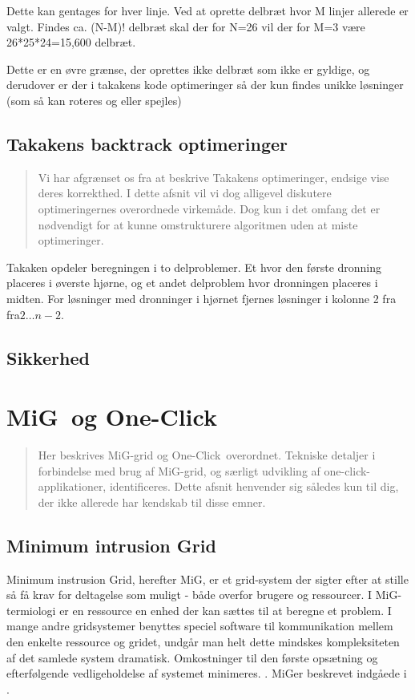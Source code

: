 \documentclass[final,a4paper,10pt]{article}
\newcommand{\mig}{MiG}
\newcommand{\oc}{One-Click}
\begin{document}
Dette kan gentages for hver linje. Ved at oprette delbræt hvor M linjer allerede er valgt. Findes ca. (N-M)! delbræt skal der for N=26 vil der for M=3 være 26*25*24=15,600 delbræt.

Dette er en øvre grænse, der oprettes ikke delbræt som ikke er gyldige, og derudover er der i takakens kode optimeringer så der kun findes unikke løsninger (som så kan roteres og eller spejles)


\subsection{Takakens backtrack optimeringer}\label{backtrackoptimeringer}
\begin{verse}
	Vi har afgrænset os fra at beskrive Takakens optimeringer, endsige vise deres korrekthed. I dette afsnit vil vi dog alligevel diskutere optimeringernes overordnede virkemåde. Dog kun i det omfang det er nødvendigt for at kunne omstrukturere algoritmen uden at miste optimeringer.   
\end{verse}

Takaken opdeler beregningen i to delproblemer. Et hvor den første dronning placeres i øverste hjørne, og et andet delproblem hvor dronningen placeres i midten. For løsninger med dronninger i hjørnet fjernes løsninger i kolonne 2 fra fra$2 \ldots n-2$. 


\subsection{Sikkerhed}

\section{\mig\ og \oc}\label{migogoneclick}
\begin{verse}
	Her beskrives \mig-grid og \oc\ overordnet. Tekniske detaljer i forbindelse med brug af \mig-grid, og særligt udvikling af one-click-applikationer, identificeres. Dette afsnit henvender sig således kun til dig, der ikke allerede har kendskab til disse emner.  
\end{verse}

\subsection{Minimum intrusion Grid}\label{mig}

Minimum instrusion Grid, herefter \mig, er et grid-system der sigter efter at stille så få krav for deltagelse som muligt - både overfor brugere og ressourcer. I \mig-termiologi er en ressource en enhed der kan sættes til at beregne et problem. I mange andre gridsystemer benyttes speciel software til kommunikation mellem den enkelte ressource og gridet, undgår man helt dette mindskes kompleksiteten af det samlede system dramatisk. Omkostninger til den første opsætning og efterfølgende vedligeholdelse af systemet minimeres. . \mig er beskrevet indgåede i \cite{simplemig,mig}.
\end{document}
